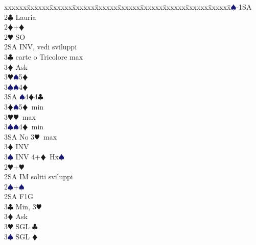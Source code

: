 \documentclass[a4paper,italian]{article}
\newcommand{\BC}{\textcolor{OliveGreen}{$\clubsuit$}}
\newcommand{\BD}{\textcolor{RedOrange}{$\vardiamondsuit$}}
\newcommand{\BH}{\textcolor{Red2}{$\varheartsuit${}}}
\newcommand{\BS}{\textcolor{MidnightBlue}{$\spadesuit${}}}
\newenvironment{bidtable}
{\begin{tabbing}

    xxxxxx\=xxxxxx\=xxxxxx\=xxxxxx\=xxxxxx\=xxxxxx\=xxxxxx\=xxxxxx\=xxxxxx\=xxxxxx\=\kill}
{\end{tabbing} }%
\begin{document}
\begin{multicols}{2}
                                        \begin{bidtable}
                                            1\BS-1SA\+\\
                                            2\BC \> Lauria\\
                                            2\BD {}+\BD \+\\
                                            2\BH \> SO\\
                                            2SA \> INV, vedi sviluppi\+\\
                                            3\BC {} carte o Tricolore max\+\\
                                            3\BD \> Ask\+\\
                                            3\BH {}\BS 5\BD \\
                                            3\BS {}\BS 4\BD \\
                                            3SA \BS 4\BD 4\BC \-\-\\
                                            3\BD {}\BS 5\BD\ min\\
                                            3\BH {}\BH\ max\\
                                            3\BS {}\BS 4\BD\ min\\
                                            3SA \> No 3\BH\ max\-\\
                                            3\BD \> INV\\
                                            3\BS \> INV 4+\BD\ Hx\BS \-\\
                                            2\BH {}+\BH \+\\
                                            2SA \> IM soliti sviluppi\-\\
                                            2\BS {}+\BS \+\\
                                            2SA \> F1G\+\\
                                            3\BC \> Min, 3\BH \+\\
                                            3\BD \> Ask\+\\
                                            3\BH \> SGL \BC \\
                                            3\BS \> SGL \BD \\

\end{bidtable}
\end{multicols}
\end{document}
